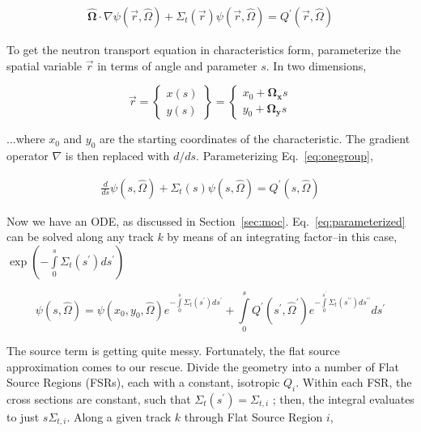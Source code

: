\documentclass[12pt]{article}
\begin{document}
\begin{gather}\label{eq:onegroup}
\mathbf{\hat{\Omega}}\cdot\nabla \psi(\vec{r},\hat{\Omega}) +
\Sigma_{t} (\vec{r}) \psi(\vec{r},\hat{\Omega}) = 
Q^\prime (\vec{r}, \hat{\Omega})
\end{gather}

To get the neutron transport equation in characteristics form, parameterize the spatial variable $\vec{r}$ in terms of angle and parameter $s$. In two dimensions,

\begin{equation}\label{eq:parametr}
\vec{r} = 
\left\{\begin{matrix}
x(s) \\
y(s) 
\end{matrix} \right\} = 
\left\{\begin{matrix}
x_0 + \mathbf{\Omega_x} s \\ 
y_0 + \mathbf{\Omega_y} s
\end{matrix} \right.
\end{equation}

...where $x_0$ and $y_0$ are the starting coordinates of the characteristic.
The gradient operator $\nabla$ is then replaced with $d/ds$. Parameterizing Eq.~\ref{eq:onegroup},

\begin{gather}\label{eq:parameterized}
\frac{d}{ds} \psi(s,\hat{\Omega}) +
\Sigma_{t} (s) \psi(s,\hat{\Omega}) = 
Q^\prime (s, \hat{\Omega})
\end{gather}

Now we have an ODE, as discussed in Section~\ref{sec:moc}. Eq.~\ref{eq:parameterized} can be solved along any track $k$ by means of an integrating factor--in this case,
$\exp\left(-\int\limits_0^s \Sigma_t (s^\prime) ds^\prime \right)$

\begin{equation}\label{eq:integatingfactor}
\psi(s, \hat{\Omega}) = 
\psi(x_0, y_0, \hat{\Omega}) e^{-\int\limits_0^s \Sigma_t (s^\prime) ds^\prime} + 
\int\limits_0^s 
Q^\prime (s^\prime, \hat{\Omega}^\prime)
e^{-\int\limits_0^{s^\prime} \Sigma_t (s^{\prime\prime}) ds^{\prime\prime}} ds^\prime
\end{equation}

The source term is getting quite messy. Fortunately, the flat source approximation comes to our rescue. Divide the geometry into a number of Flat Source Regions (FSRs), each with a constant, isotropic $Q_i$. Within each FSR, the cross sections are constant, such that $\Sigma_t (s^\prime) = \Sigma_{t,i}$ ; then, the integral evaluates to just $s \Sigma_{t,i}$. Along a given track $k$ through Flat Source Region $i$,
\end{document}
